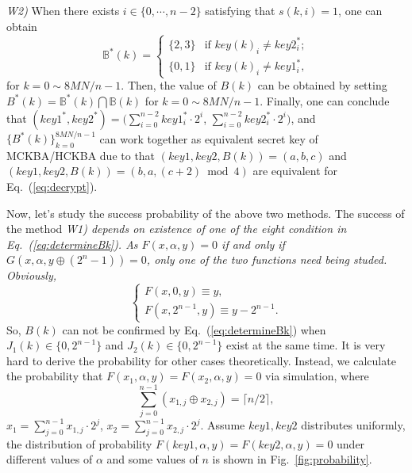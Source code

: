 \documentclass{ws-ijbc}
\begin{document}
\begin{itemlist}
\item \textit{W2)} When there exists $i\in\{0, \cdots, n-2\}$ satisfying that $s(k, i)=1$, one can obtain
\begin{equation}
\mathbb{B}^*(k)=
\begin{cases}
\{2,3\}  & \mbox{if } key(k)_i\neq key2^*_{i};\\
\{0,1\}  & \mbox{if } key(k)_i\neq key1^*_{i},
\end{cases}
\label{eq:determinebits1}
\end{equation}
for $k=0\sim 8MN/n-1$. Then, the value of $B(k)$ can be obtained by setting $B^*(k)=\mathbb{B}^*(k)\bigcap \mathbb{B}(k)$ for
$k=0\sim 8MN/n-1$. Finally, one can conclude that $(key1^*, key2^*)=(\sum_{i=0}^{n-2}key1^*_{i}\cdot 2^i$, $\sum_{i=0}^{n-2}key2^*_{i}\cdot 2^i)$, and
$\{B^*(k)\}_{k=0}^{8MN/n-1}$ can work together as equivalent secret key of MCKBA/HCKBA due to that $(key1, key2, B(k))=(a, b, c)$
and $(key1, key2, B(k))=(b, a, (c+2)\bmod 4)$ are equivalent for Eq.~(\ref{eq:decrypt}).
\end{itemlist}

Now, let's study the success probability of the above two methods. The success of the method \textit{W1) depends on existence of one of the eight
condition in Eq.~(\ref{eq:determineBk}). As $F(x, \alpha, y)=0$ if and only if $G(x, \alpha, y\oplus (2^n-1))=0$, only one of the two functions
need being studed. Obviously, }
\begin{equation}
\begin{cases}
F(x, 0, y)\equiv y, \\
F(x, 2^{n-1}, y)\equiv y-2^{n-1}.
\end{cases}
\label{eq:SpecialCondition}
\end{equation}
So, $B(k)$ can not be confirmed by  Eq.~(\ref{eq:determineBk}) when
 $J_1(k)\in\{0, 2^{n-1} \}$ and $J_2(k)\in\{0, 2^{n-1} \}$ exist at the same time. It is very hard to derive the probability for other cases theoretically.
Instead, we calculate the probability that $F(x_1, \alpha, y)=F(x_2, \alpha, y)=0$ via simulation, where
\begin{equation}
\sum_{j=0}^{n-1}(x_{1,j}\oplus x_{2,j})=\lceil n/2\rceil,
\label{eq:constraint}
\end{equation}
$x_1=\sum_{j=0}^{n-1}x_{1,j}\cdot 2^j$, $x_2=\sum_{j=0}^{n-1}x_{2,j}\cdot 2^j$. Assume $key1, key2$ distributes uniformly, the distribution of
probability $F(key1, \alpha, y)=F(key2, \alpha, y)=0$ under different values of $\alpha$ and some values of $n$ is shown in Fig.~\ref{fig:probability}.
\end{document}
